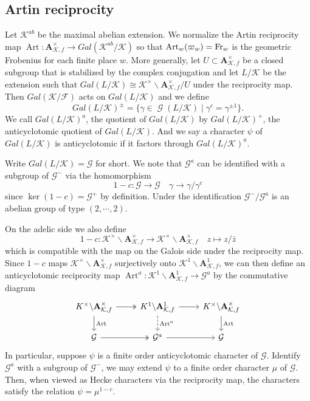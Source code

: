 \documentclass[leqno]{amsart}
\theoremstyle{definition}
\theoremstyle{remark}
\newcommand{\A}{\mathbf A}
\DeclareMathOperator{\Gal}{\mathcal{G}}
\DeclareMathOperator{\Art}{Art}
\newcommand{\Fr}{\textnormal{Fr}} %
\newcommand{\F}{{\mathcal{F}}} %
\newcommand{\K}{{\mathcal{K}}} %
\newcommand{\cG}{\mathcal{G}}
\begin{document}
\subsection{Artin reciprocity}

Let $\K^{ab}$ be the maximal abelian extension.
We normalize the Artin reciprocity map
$\Art\colon \A_{\K,f}^\times \to Gal(\K^{ab}/\K)$
so that $\Art_w(\varpi_w)=\Fr_w$
is the geometric Frobenius for each finite place $w$.
More generally,
let $U\subset \A_{\K,f}^\times$ be 
a closed subgroup that is stabilized 
by the complex conjugation
and let $L/\K$ be the extension such that 
$Gal(L/\K)\cong \K^\times\backslash \A_{\K,f}^\times/U$
under the reciprocity map.
Then $Gal(\K/\F)$ acts on $Gal(L/\K)$
and we define
\[
    Gal(L/\K)^{\pm}=\{\gamma\in \Gal(L/\K)\mid 
    \gamma^c=\gamma^{\pm1}\}.
\]
We call $Gal(L/\K)^a$, the quotient of 
$Gal(L/\K)$ by $Gal(L/\K)^+$,
the anticyclotomic quotient
of $Gal(L/\K)$.
And we say a character $\psi$ of $Gal(L/\K)$
is anticyclotomic if it factors through $Gal(L/\K)^a$.

Write $Gal(L/\K)=\cG$ for short.
We note that $\cG^a$ can be
identified with a subgroup of $\cG^-$ via the homomorphism
\[
    1-c\colon \cG\to \cG\quad \gamma\to \gamma/\gamma^c
\]
since $\ker(1-c)=\cG^+$ by definition.
Under the identification
$\cG^-/\cG^a$ is an abelian group of type $(2,\cdots,2)$.

On the adelic side we also define
\[
1-c\colon \K^\times\backslash\A_{\K,f}^\times\to
\K^\times\backslash\A_{\K,f}^\times\quad
z\mapsto z/\bar{z}
\]
which is compatible with the map on the Galois side
under the reciprocity map.
Since $1-c$ maps $\K^\times\backslash \A_{\K,f}^\times$
surjectively onto  $\K^1\backslash \A_{\K,f}^1$,
we can then define an anticyclotomic
reciprocity map $\Art^a\colon \K^1\backslash\A_{\K,f}^1\to \cG^a$
by the commutative diagram
\begin{equation}\label{eq:anticyc_rec}
\begin{tikzcd}
    K^\times\backslash\A_{\K,f}^\times
    \arrow[r,twoheadrightarrow]\arrow[d,"\Art"]&
    K^1\backslash\A_{\K,f}^1 \arrow[r]\arrow[d,"\Art^a",dashed]&
    K^\times\backslash\A_{\K,f}^\times\arrow[d,"\Art"]\\
    \cG \arrow[r,twoheadrightarrow]&
    \cG^a\arrow[r]&
    \cG
\end{tikzcd}
\end{equation}
In particular, suppose $\psi$ is a finite order 
anticyclotomic character of $\cG$.
Identify $\cG^a$ with a subgroup of $\cG^-$,
we may extend $\psi$ to a finite order character $\mu$ of $\cG$.
Then, when viewed as Hecke characters via the reciprocity map,
the characters satisfy the relation $\psi=\mu^{1-c}$.
\end{document}
